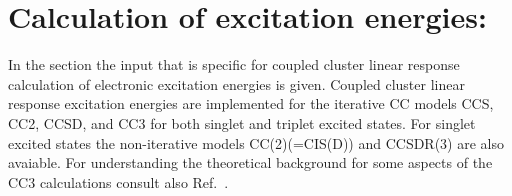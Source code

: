 
\section{Calculation of excitation energies: }\label{sec:ccexci}

In the  section the input that is
specific for coupled cluster linear response calculation of
electronic excitation energies is given. 
Coupled cluster linear response excitation energies 
are implemented for the iterative CC models CCS, CC2, CCSD, and CC3 for 
both singlet and triplet excited states.
For singlet excited states the non-iterative models CC(2)(=CIS(D)) and CCSDR(3)
are also avaiable.
For understanding the theoretical background for some
aspects of the CC3 calculations consult also Ref.\ \cite{Christiansen:JCP105,Hald:JCP113,Christiansen:JCP103,Hald:JCP115}.

\begin{center}
\end{center}



